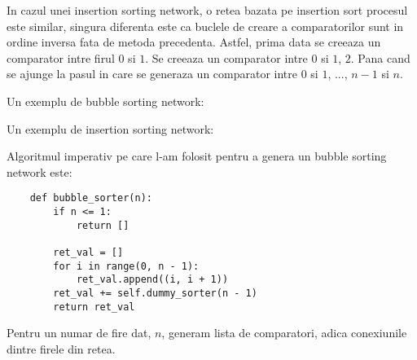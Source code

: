 \documentclass[12pt]{article}
\begin{document}
In cazul unei insertion sorting network, o retea bazata pe insertion sort procesul este similar, singura diferenta este ca buclele de creare a comparatorilor sunt in ordine inversa fata de metoda precedenta. Astfel, prima data se creeaza un comparator 
intre firul $0$ si $1$. Se creeaza un comparator intre $0$ si $1$, $2$. Pana cand se ajunge la pasul in care se generaza un comparator intre $0$ si $1$, ..., $n-1$ si $n$. 

Un exemplu de bubble sorting network:
\begin{center}
\end{center}

Un exemplu de insertion sorting network:

\begin{center}
\end{center}

Algoritmul imperativ pe care l-am folosit pentru a genera un bubble sorting network este:
\begin{lstlisting}
    def bubble_sorter(n):
        if n <= 1:
            return []

        ret_val = []
        for i in range(0, n - 1):
            ret_val.append((i, i + 1))
        ret_val += self.dummy_sorter(n - 1)
        return ret_val
\end{lstlisting}
Pentru un numar de fire dat, $n$, generam lista de comparatori, adica conexiunile dintre firele din retea.
\end{document}
